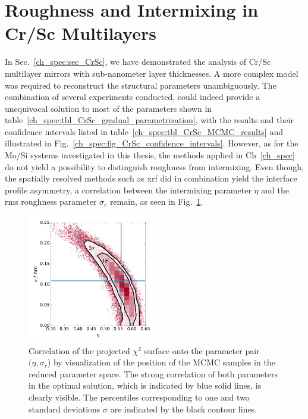 \section{Roughness and Intermixing in Cr/Sc Multilayers} \label{ch_diff:sec_CrSc}
In Sec.~\ref{ch_spec:sec_CrSc}, we have demonstrated the analysis of Cr/Sc multilayer mirrors with sub-nanometer layer thicknesses. A more complex model was required to reconstruct the structural parameters unambiguously. The combination of several experiments conducted, could indeed provide a unequivocal solution to most of the parameters shown in table~\ref{ch_spec:tbl_CrSc_gradual_parametrization}, with the results and their confidence intervals listed in table~\ref{ch_spec:tbl_CrSc_MCMC_results} and illustrated in Fig.~\ref{ch_spec:fig_CrSc_confidence_intervals}. However, as for the Mo/Si systems investigated in this thesis, the methods applied in Ch~\ref{ch_spec} do not yield a possibility to distinguish roughness from intermixing. Even though, the spatially resolved methods such as \gls{xrf} did in combination yield the interface profile asymmetry, a correlation between the intermixing parameter $\eta$ and the \gls{rms} roughness parameter $\sigma_r$ remain, as seen in Fig.~\ref{ch_diff:fig_eta_sigma_correlation}.
\begin{figure}[htbp]
  \centering
  \includegraphics[width=0.5\textwidth]{images/eta_sigma_correlation}
  \caption{Correlation of the projected $\chi^2$ surface onto the parameter 
pair $(\eta, \sigma_r$) by visualization of the position of the MCMC samples in 
the reduced parameter space. The strong correlation of both parameters in the 
optimal solution, which is indicated by blue solid lines, is clearly visible. 
The percentiles corresponding to one and two standard deviations $\sigma$ are 
indicated by the black contour lines.}
  \label{ch_diff:fig_eta_sigma_correlation}
\end{figure}

